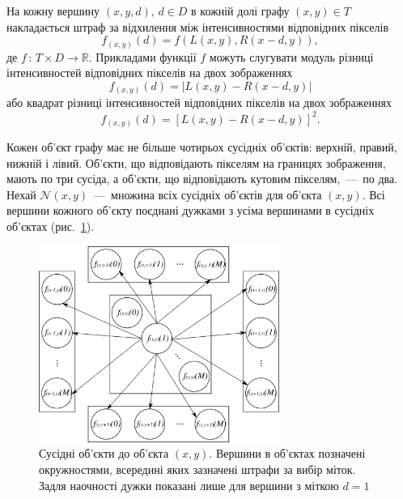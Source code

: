 На кожну вершину $\left(x, y, d \right), \, d \in D$ в кожній долі графу
$\left(x, y \right) \in T$
накладається штраф за відхилення між інтенсивностями відповідних пікселів
\begin{equation} \label{eq:penalty:vertex}
    f_{\left(x, y \right)} \left(d \right) =
    f \left(
        L \left(x, y \right),
        R \left(x - d, y \right)
    \right),
\end{equation}
де $f \, : \, T \times D \to \mathbb{R}$.
Прикладами функції $f$ можуть слугувати модуль
різниці інтенсивностей відповідних пікселів на двох зображеннях
\begin{equation*}
    f_{\left(x, y \right)} \left(d \right) =
    \left| L \left(x, y \right) - R \left(x - d, y \right) \right|
\end{equation*}
або квадрат різниці інтенсивностей відповідних пікселів на двох зображеннях
\begin{equation*}
    f_{\left(x, y \right)} \left(d \right) =
    \left[ L \left(x, y \right) - R \left(x - d, y \right) \right]^2.
\end{equation*}

Кожен об'єкт графу має не більше чотирьох сусідніх об'єктів: верхній, правий,
нижній і лівий.
Об'єкти, що відповідають пікселям на границях зображення, мають по три сусіда,
а об'єкти, що відповідають кутовим пікселям,~---~по два.
Нехай $\mathcal{N} \left( x, y \right) $~---~множина всіх
сусідніх об'єктів для об'єкта $\left( x, y \right)$.
Всі вершини кожного об'єкту поєднані дужками з усіма
вершинами в сусідніх об'єктах (рис.~\ref{fig:neighbors}).

\begin{figure}[h]
  \centering
  \includegraphics[width=0.7\textwidth]{images/neighbors}
  \caption{Сусідні об'єкти до об'єкта $\left(x, y \right)$.
           Вершини в об'єктах позначені окружностями,
           всередині яких зазначені штрафи за вибір міток.
           Задля наочності дужки показані лише для вершини з міткою $d = 1$}
  \label{fig:neighbors}
\end{figure}

